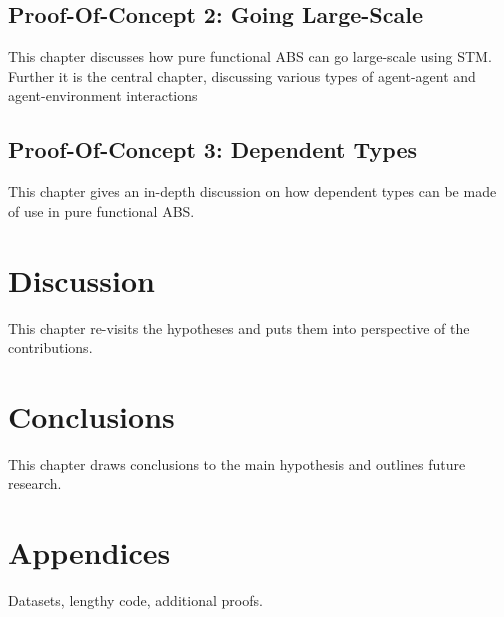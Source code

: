 \subsection{Proof-Of-Concept 2: Going Large-Scale}
This chapter discusses how pure functional ABS can go large-scale using STM. Further it is the central chapter, discussing various types of agent-agent and agent-environment interactions

%

\subsection{Proof-Of-Concept 3: Dependent Types}
This chapter gives an in-depth discussion on how dependent types can be made of use in pure functional ABS.

\section{Discussion}
This chapter re-visits the hypotheses and puts them into perspective of the contributions.

\section{Conclusions}
This chapter draws conclusions to the main hypothesis and outlines future research.

\section{Appendices}
Datasets, lengthy code, additional proofs.
